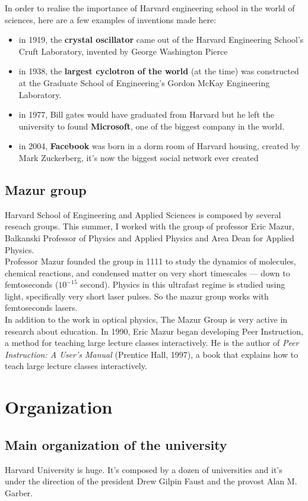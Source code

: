 \documentclass[10pt,a4paper]{article}
\newcommand{\hseas}{Harvard School of Engineering and Applied Sciences}
\begin{document}
In order to realise the importance of Harvard engineering school in the world of sciences, here are a few examples of inventions made here:
\begin{itemize}
\item in 1919, the \textbf{crystal oscillator} came out of the Harvard Engineering School’s Cruft Laboratory, invented by George Washington Pierce
\item in 1938, the \textbf{largest cyclotron of the world} (at the time) was constructed at the Graduate School of Engineering's Gordon McKay Engineering Laboratory.
\item in 1977, Bill gates would have graduated from Harvard but he left the university  to found \textbf{Microsoft}, one of the biggest company in the world.
\item in 2004, \textbf{Facebook} was born in a dorm room of Harvard housing, created by Mark Zuckerberg, it's now the biggest social network ever created
\end{itemize}

\subsection{Mazur group}

\hseas{} is composed by several reseach groups. This summer, I worked with the group of professor Eric Mazur, Balkanski Professor of Physics and Applied Physics and Area Dean for Applied Physics.\\
Professor Mazur founded the group in 1111%
to study the dynamics of molecules, chemical reactions, and condensed matter on very short timescales — down to femtoseconds ($10^{-15}$ second). Physics in this ultrafast regime is studied using light, specifically very short laser pulses. So the mazur group works with femtoseconds lasers.\\
In addition to the work in optical physics, The Mazur Group is very active in research about education. In 1990, Eric Mazur began developing Peer Instruction, a method for teaching large lecture classes interactively. He is the author of \textit{Peer Instruction: A User's Manual} (Prentice Hall, 1997), a book that explains how to teach large lecture classes interactively.

\newpage
\section{Organization}
\subsection{Main organization of the university}
Harvard University is huge. It's composed by a dozen of universities and it's under the direction of the president Drew Gilpin Faust and the provost Alan M. Garber.\\
\end{document}
